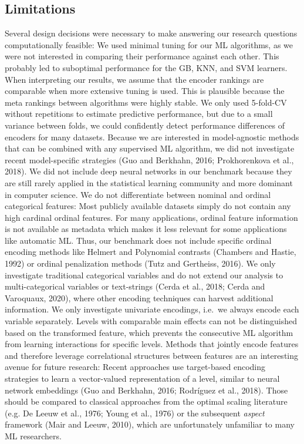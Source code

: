 \documentclass[smallextended]{svjour3}       %
\begin{document}
\hypertarget{limitations}{%
\subsection{Limitations}\label{limitations}}

Several design decisions were necessary to make answering our research questions computationally feasible:
We used minimal tuning for our ML algorithms, as we were not interested in comparing their performance against each other.
This probably led to suboptimal performance for the GB, KNN, and SVM learners.
When interpreting our results, we assume that the encoder rankings are comparable when more extensive tuning is used.
This is plausible because the meta rankings between algorithms were highly stable.
We only used 5-fold-CV without repetitions to estimate predictive performance, but due to a small variance between folds, we could confidently detect performance differences of encoders for many datasets.
Because we are interested in model-agnostic methods that can be combined with any supervised ML algorithm, we did not investigate recent model-specific strategies (Guo and Berkhahn, 2016; Prokhorenkova et al., 2018).
We did not include deep neural networks in our benchmark because they are still rarely applied in the statistical learning community and more dominant in computer science.
We do not differentiate between nominal and ordinal categorical features:
Most publicly available datasets simply do not contain any high cardinal ordinal features.
For many applications, ordinal feature information is not available as metadata which makes it less relevant for some applications like automatic ML.
Thus, our benchmark does not include specific ordinal encoding methods like Helmert and Polynomial contrasts (Chambers and Hastie, 1992) or ordinal penalization methods (Tutz and Gertheiss, 2016).
We only investigate traditional categorical variables and do not extend our analysis to multi-categorical variables or text-strings (Cerda et al., 2018; Cerda and Varoquaux, 2020), where other encoding techniques can harvest additional information.
We only investigate univariate encodings, i.e.~we always encode each variable separately.
Levels with comparable main effects can not be distinguished based on the transformed feature, which prevents the consecutive ML algorithm from learning interactions for specific levels.
Methods that jointly encode features and therefore leverage correlational structures between features are an interesting avenue for future research:
Recent approaches use target-based encoding strategies to learn a vector-valued representation of a level, similar to neural network embeddings (Guo and Berkhahn, 2016; Rodríguez et al., 2018).
Those should be compared to classical approaches from the optimal scaling literature (e.g. De Leeuw et al., 1976; Young et al., 1976) or the subsequent \emph{aspect} framework (Mair and Leeuw, 2010), which are unfortunately unfamiliar to many ML researchers.
\end{document}
